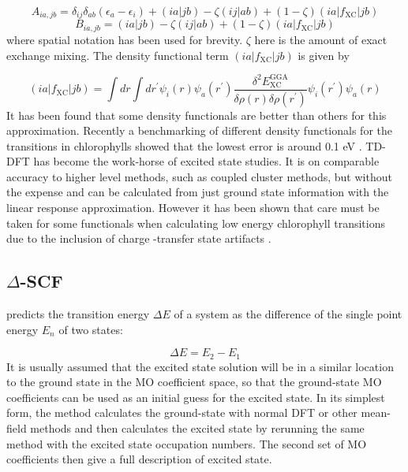 \begin{equation}
A_{ia, jb} = \delta_{ij} \delta_{ab} \left(\epsilon_a - \epsilon_i \right) + \left(ia|jb\right) - \zeta\left(ij|ab\right) + \left(1-\zeta\right)\left(ia|f_{\text{XC}}|jb\right)
\end{equation}
%
\begin{equation}
B_{ia, jb} = \left(ia|jb\right) - \zeta\left(ij|ab\right) + \left(1-\zeta\right)\left(ia|f_{\text{XC}}|jb\right)
\end{equation}
%
where spatial notation has been used for brevity. $\zeta$ here is the amount of 
exact exchange mixing. The density functional term $\left(ia|f_{\text{XC}}|jb\right)$ 
is given by

\begin{equation}
    \left(ia|f_{\text{XC}}|jb\right) = \int dr \int dr^\prime \psi_i \left(r\right)\psi_a \left(r^\prime\right) \frac{\delta^2 E^{\text{GGA}}_{\text{XC}}}{\delta\rho\left(r\right)\delta\rho\left(r^\prime\right)} \psi_i \left(r^\prime\right)\psi_a \left(r\right)
\end{equation}
%
It has been found that some density functionals are better than others for this
approximation. Recently a benchmarking of different density functionals for the 
\Qy transitions in chlorophylls showed that the lowest error is around 0.1 eV \cite{List2013}. 
TD-DFT has become the work-horse of excited state studies. It is on comparable accuracy
to higher level methods, such as coupled cluster methods, but without the expense \cite{Laurent2013}
and can be calculated from just ground state information with the linear response
approximation. However it has been shown that care must be taken for some functionals
when calculating low energy chlorophyll transitions due to the inclusion of charge
-transfer state artifacts \cite{Dahlbom2005}.

\subsection{$\Delta$-SCF}
\label{subsec{dscf_and_eigdiff}}

\dscf \cite{Jones1989, Hellman2004} predicts the transition energy $\Delta E$ of 
a system as the difference of the single point energy $E_n$ of two states:

\begin{equation}
\Delta E = E_{2} - E_{1}
\end{equation}
%
It is usually assumed that the excited state solution will be in a similar location
to the ground state in the MO coefficient space, so that the ground-state MO coefficients
can be used as an initial guess for the excited state. In its simplest form, the
\dscf method calculates the ground-state with normal DFT or other mean-field methods
and then calculates the excited state by rerunning the same method with the excited
state occupation numbers. The second set of MO coefficients then give a full description
of excited state.

